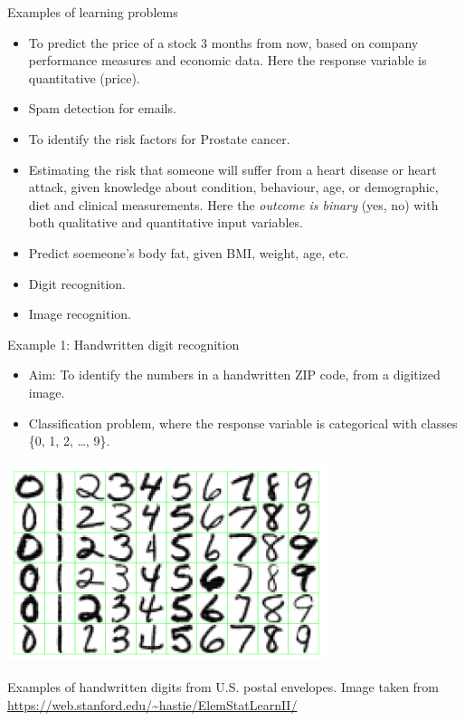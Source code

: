 \documentclass[ignorenonframetext,]{beamer}
\providecommand{\tightlist}{%
  \setlength{\itemsep}{0pt}\setlength{\parskip}{0pt}}
\begin{document}
\begin{frame}{Examples of learning problems}

\begin{itemize}
\item
  To predict the price of a stock 3 months from now, based on company
  performance measures and economic data. Here the response variable is
  quantitative (price).
\item
  Spam detection for emails.
\item
  To identify the risk factors for Prostate cancer.
\item
  Estimating the risk that someone will suffer from a heart disease or
  heart attack, given knowledge about condition, behaviour, age, or
  demographic, diet and clinical measurements. Here the \emph{outcome is
  binary} (yes, no) with both qualitative and quantitative input
  variables.
\item
  Predict soemeone's body fat, given BMI, weight, age, etc.
\item
  Digit recognition.
\item
  Image recognition.
\end{itemize}

\end{frame}

\begin{frame}

\begin{block}{Example 1: Handwritten digit recognition}

\begin{itemize}
\tightlist
\item
  Aim: To identify the numbers in a handwritten ZIP code, from a
  digitized image.
\item
  Classification problem, where the response variable is categorical
  with classes \{0, 1, 2, \ldots{}, 9\}. \vspace{1mm}
\end{itemize}

\includegraphics[width=0.70000\textwidth]{digits.png} \vspace{1mm}

Examples of handwritten digits from U.S. postal envelopes. \scriptsize
Image taken from \url{https://web.stanford.edu/~hastie/ElemStatLearnII/}

\end{block}

\end{frame}
\end{document}
